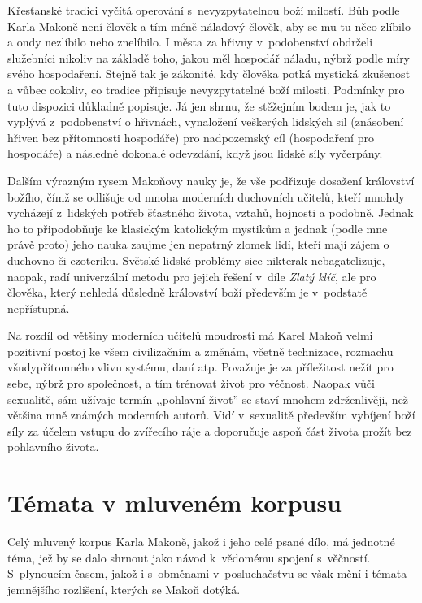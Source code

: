 Křesťanské tradici vyčítá operování s~nevyzpytatelnou boží milostí. Bůh podle
Karla Makoně není člověk a tím méně náladový člověk, aby se mu tu něco zlíbilo a
ondy nezlíbilo nebo znelíbilo. I města za hřivny v~podobenství obdrželi služebníci nikoliv na
základě toho, jakou měl hospodář náladu, nýbrž podle míry svého hospodaření.
Stejně tak je zákonité, kdy člověka potká mystická zkušenost a vůbec cokoliv, co
tradice připisuje nevyzpytatelné boží milosti. Podmínky pro tuto dispozici
důkladně popisuje. Já jen shrnu, že stěžejním bodem je, jak to vyplývá
z~podobenství o hřivnách, vynaložení veškerých lidských sil (znásobení hřiven
bez přítomnosti hospodáře) pro nadpozemský cíl (hospodaření pro hospodáře) a
následné dokonalé odevzdání, když jsou lidské síly vyčerpány.

Dalším výrazným rysem Makoňovy nauky je, že vše podřizuje dosažení království
božího, čímž se odlišuje od mnoha moderních duchovních učitelů, kteří mnohdy
vycházejí z~lidských potřeb šťastného života, vztahů, hojnosti a podobně. Jednak
ho to připodobňuje ke klasickým katolickým mystikům a jednak (podle mne právě
proto) jeho nauka zaujme jen nepatrný zlomek lidí, kteří mají zájem o duchovno
či ezoteriku. Světské lidské problémy sice nikterak nebagatelizuje, naopak, radí
univerzální metodu pro jejich řešení v~díle {\em Zlatý klíč}, ale pro člověka,
který nehledá důsledně království boží především je v~podstatě nepřístupná.

Na rozdíl od většiny moderních učitelů moudrosti má Karel Makoň velmi pozitivní
postoj ke všem civilizačním a změnám, včetně technizace, rozmachu
všudypřítomného vlivu systému, daní atp. Považuje je za příležitost nežít pro
sebe, nýbrž pro společnost, a tím trénovat život pro věčnost. Naopak vůči
sexualitě, sám užívaje termín ,,pohlavní život'' se staví mnohem zdrženlivěji,
než většina mně známých moderních autorů. Vidí v~sexualitě především vybíjení
boží síly za účelem vstupu do zvířecího ráje a doporučuje aspoň část života
prožít bez pohlavního života.

\section{Témata v mluveném korpusu}

Celý mluvený korpus Karla Makoně, jakož i jeho celé psané dílo, má jednotné
téma, jež by se dalo shrnout jako návod k~vědomému spojení s~věčností.
S~plynoucím časem, jakož i s~obměnami v~posluchačstvu se však mění i témata
jemnějšího rozlišení, kterých se Makoň dotýká.

